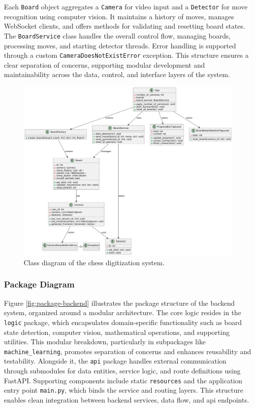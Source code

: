 Each \texttt{Board} object aggregates a \texttt{Camera} for video input and a \texttt{Detector} for move recognition using computer vision. It maintains a history of moves, manages WebSocket clients, and offers methods for validating and resetting board states. The \texttt{BoardService} class handles the overall control flow, managing boards, processing moves, and starting detector threads. Error handling is supported through a custom \texttt{CameraDoesNotExistError} exception. This structure ensures a clear separation of concerns, supporting modular development and maintainability across the data, control, and interface layers of the system.

\begin{figure}[h!]
\centering
\includegraphics[width=0.75\linewidth]{figures/results//uml/class.png}
\caption[Class Diagram]{Class diagram of the chess digitization system.}
\label{fig:class}
\end{figure}

\newpage

\subsubsection*{Package Diagram}

Figure \ref{fig:package-backend} illustrates the package structure of the backend system, organized around a modular architecture. The core logic resides in the \texttt{logic} package, which encapsulates domain-specific functionality such as board state detection, computer vision, mathematical operations, and supporting utilities. This modular breakdown, particularly in subpackages like \texttt{machine\_learning}, promotes separation of concerns and enhances reusability and testability. Alongside it, the \texttt{api} package handles external communication through submodules for data entities, service logic, and route definitions using FastAPI. Supporting components include static \texttt{resources} and the application entry point \texttt{main.py}, which binds the service and routing layers. This structure enables clean integration between backend services, data flow, and \gls{api} endpoints. \\

